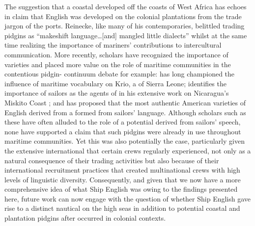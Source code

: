 The suggestion that a coastal  developed off the coasts of West Africa has echoes in  claim that  English was developed on the colonial plantations from the trade jargon of the ports. Reinecke, like many of his contemporaries, belittled trading pidgins as “makeshift language…[and] mangled little dialects” \citep[107]{Reinecke1938} whilst at the same time realizing the importance of mariners’ contributions to intercultural communication. More recently, scholars have recognized the importance of  varieties and placed more value on the role of maritime communities in the contentious pidgin- continuum debate \citep[7,]{Holm1988} for example: \citet{Hancock1976} has long championed the influence of maritime vocabulary on Krio, a  of Sierra Leone; \citet{Holm1981} identifies the importance of sailors as the agents of  in his extensive work on Nicaragua’s Miskito Coast ; and \citet{Dillard1992} has proposed that the most authentic American varieties of English derived from a  formed from sailors’ language. Although scholars such as these have often alluded to the role of a potential  derived from sailors’ speech, none have supported a claim that such pidgins were already in use throughout maritime communities. Yet this was also potentially the case, particularly given the extensive international  that certain crews regularly experienced, not only as a natural consequence of their trading activities but also because of their international recruitment practices that created multinational crews with high levels of linguistic diversity. Consequently, and given that we now have a more comprehensive idea of what Ship English was owing to the findings presented here, future work can now engage with the question of whether Ship English gave rise to a distinct nautical  on the high seas in addition to potential coastal and plantation pidgins after  occurred in colonial contexts. 

